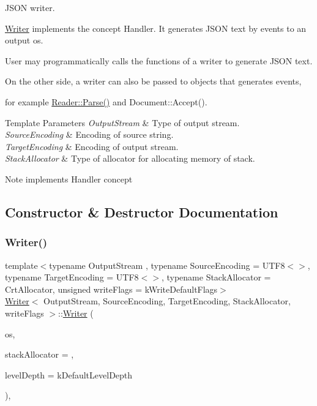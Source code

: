 J\+S\+ON writer. 

\hyperlink{class_writer}{Writer} implements the concept Handler. It generates J\+S\+ON text by events to an output os.

User may programmatically calls the functions of a writer to generate J\+S\+ON text.

On the other side, a writer can also be passed to objects that generates events,

for example \hyperlink{class_generic_reader_a0c450620d14ff1824e58bb7bd9b42099}{Reader\+::\+Parse()} and Document\+::\+Accept().


\begin{DoxyTemplParams}{Template Parameters}
{\em Output\+Stream} & Type of output stream. \\
\hline
{\em Source\+Encoding} & Encoding of source string. \\
\hline
{\em Target\+Encoding} & Encoding of output stream. \\
\hline
{\em Stack\+Allocator} & Type of allocator for allocating memory of stack. \\
\hline
\end{DoxyTemplParams}
\begin{DoxyNote}{Note}
implements Handler concept 
\end{DoxyNote}


\subsection{Constructor \& Destructor Documentation}
\mbox{\label{class_writer_af4f54830d6927d9daf5bd53bfd134dd3}} 
\subsubsection{\texorpdfstring{Writer()}{Writer()}}
{\footnotesize\ttfamily template$<$typename Output\+Stream , typename Source\+Encoding  = U\+T\+F8$<$$>$, typename Target\+Encoding  = U\+T\+F8$<$$>$, typename Stack\+Allocator  = Crt\+Allocator, unsigned write\+Flags = k\+Write\+Default\+Flags$>$ \\
\hyperlink{class_writer}{Writer}$<$ Output\+Stream, Source\+Encoding, Target\+Encoding, Stack\+Allocator, write\+Flags $>$\+::\hyperlink{class_writer}{Writer} (\begin{DoxyParamCaption}\item[{Output\+Stream \&}]{os,  }\item[{Stack\+Allocator $\ast$}]{stack\+Allocator = {},  }\item[{size\+\_\+t}]{level\+Depth = {\ttfamily kDefaultLevelDepth} }\end{DoxyParamCaption})\hspace{0.3cm}{\ttfamily [inline]}, {\ttfamily [explicit]}}



